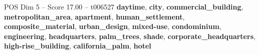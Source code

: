 \begin{textsample}{POS Dim 5 – Score 17.00 – t006527}  \label{ex:f5_pos_019}
\textbf{daytime}, \textbf{city}, \textbf{commercial\_building}, \textbf{metropolitan\_area}, \textbf{apartment}, \textbf{human\_settlement}, \textbf{composite\_material}, \textbf{urban\_design}, \textbf{mixed-use}, \textbf{condominium}, \textbf{engineering}, \textbf{headquarters}, \textbf{palm\_trees}, \textbf{shade}, \textbf{corporate\_headquarters}, \textbf{high-rise\_building}, \textbf{california\_palm}, \textbf{hotel}

\end{textsample}
